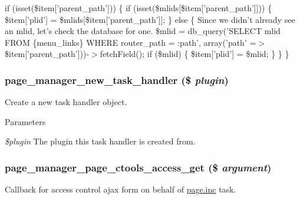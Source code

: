 if (isset(\$item\mbox{[}'parent\_\-path'\mbox{]})) \{ if (isset(\$mlids\mbox{[}\$item\mbox{[}'parent\_\-path'\mbox{]}\mbox{]})) \{ \$item\mbox{[}'plid'\mbox{]} = \$mlids\mbox{[}\$item\mbox{[}'parent\_\-path'\mbox{]}\mbox{]}; \} else \{ Since we didn't already see an mlid, let's check the database for one. \$mlid = db\_\-query('SELECT mlid FROM \{menu\_\-links\} WHERE router\_\-path = :path', array('path' =$>$ \$item\mbox{[}'parent\_\-path'\mbox{]}))-\/$>$fetchField(); if (\$mlid) \{ \$item\mbox{[}'plid'\mbox{]} = \$mlid; \} \} \}\hypertarget{page__manager_8module_a021f275296e873aa39120d2615292172}{
\subsubsection[{page\_\-manager\_\-new\_\-task\_\-handler}]{\setlength{\rightskip}{0pt plus 5cm}page\_\-manager\_\-new\_\-task\_\-handler (\$ {\em plugin})}}
\label{page__manager_8module_a021f275296e873aa39120d2615292172}
Create a new task handler object.


\begin{DoxyParams}{Parameters}
\item[{\em \$plugin}]The plugin this task handler is created from. \end{DoxyParams}
\hypertarget{page__manager_8module_a7485da6795decccb834c9457e7050917}{
\subsubsection[{page\_\-manager\_\-page\_\-ctools\_\-access\_\-get}]{\setlength{\rightskip}{0pt plus 5cm}page\_\-manager\_\-page\_\-ctools\_\-access\_\-get (\$ {\em argument})}}
\label{page__manager_8module_a7485da6795decccb834c9457e7050917}
Callback for access control ajax form on behalf of \hyperlink{page_8inc}{page.inc} task.

